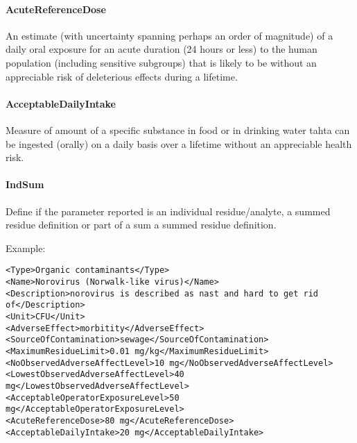 \documentclass[a4paper]{report}
\begin{document}
\paragraph{AcuteReferenceDose}
An estimate (with uncertainty spanning perhaps an order of magnitude) of a daily oral exposure for an acute duration (24 hours or less) to the human population (including sensitive subgroups) that is likely to be without an appreciable risk of deleterious effects during a lifetime.

\paragraph{AcceptableDailyIntake}
Measure of amount of a specific substance in food or in drinking water tahta can be ingested (orally) on a daily basis over a lifetime without an appreciable health risk.

\paragraph{IndSum}
Define if the parameter reported is an individual residue/analyte, a summed residue definition or part of a sum a summed residue definition.

Example:
\begin{lstlisting}[basicstyle=\footnotesize]
<Type>Organic contaminants</Type>
<Name>Norovirus (Norwalk-like virus)</Name>
<Description>norovirus is described as nast and hard to get rid
of</Description>
<Unit>CFU</Unit>
<AdverseEffect>morbitity</AdverseEffect>
<SourceOfContamination>sewage</SourceOfContamination>
<MaximumResidueLimit>0.01 mg/kg</MaximumResidueLimit>
<NoObservedAdverseAffectLevel>10 mg</NoObservedAdverseAffectLevel>
<LowestObservedAdverseAffectLevel>40 mg</LowestObservedAdverseAffectLevel>
<AcceptableOperatorExposureLevel>50 mg</AcceptableOperatorExposureLevel>
<AcuteReferenceDose>80 mg</AcuteReferenceDose>
<AcceptableDailyIntake>20 mg</AcceptableDailyIntake>
\end{lstlisting}


\end{document}
